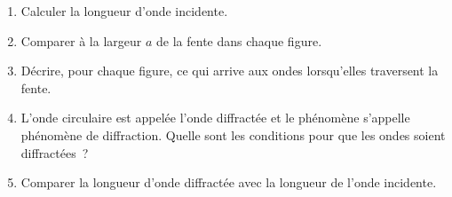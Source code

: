 \begin{figure}[H]
\end{figure}

\begin{enumerate}
    \item Calculer la longueur d'onde incidente.
    \item Comparer à la largeur $a$ de la fente dans chaque figure.
    \item Décrire, pour chaque figure, ce qui arrive aux ondes lorsqu'elles
          traversent la fente.
    \item L'onde circulaire est appelée l'onde diffractée et le phénomène
          s'appelle phénomène de diffraction. Quelle sont les conditions pour
          que les ondes soient diffractées~?
    \item Comparer la longueur d'onde diffractée avec la longueur de l'onde
          incidente.
\end{enumerate}
